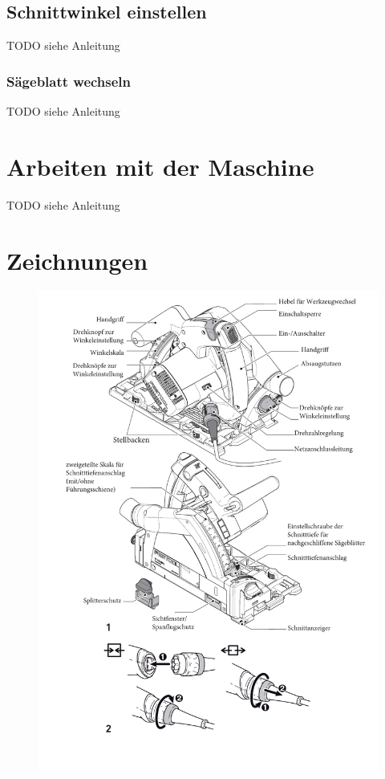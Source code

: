 \documentclass{\basedir/fablab-document}
\begin{document}
\subsection{Schnittwinkel einstellen}
TODO siehe Anleitung

\subsubsection{Sägeblatt wechseln}
TODO siehe Anleitung

\section{Arbeiten mit der Maschine}
TODO siehe Anleitung

\section{Zeichnungen}
\begin{figure}[H]
	\centering
	\includegraphics[width=1\textwidth]{img/festool_bilder_1Teil1.pdf}
	\caption{}
	\label{fig:gehaeuse_oben}
\end{figure}
\end{document}
